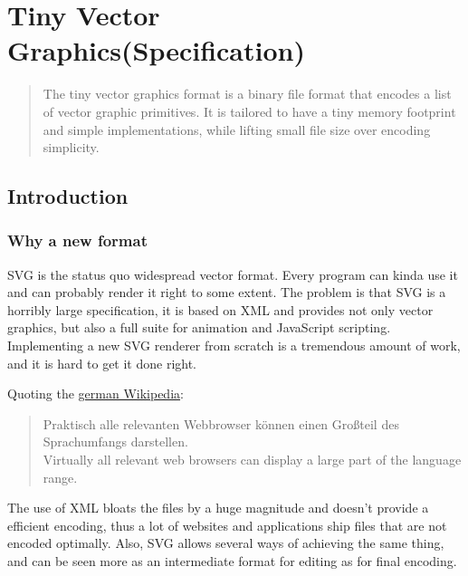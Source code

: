 \documentclass[]{article}
\begin{document}
\hypertarget{tiny-vector-graphics-specification}{%
\section{Tiny Vector Graphics(Specification)}\label{tiny-vector-graphics-specification}}

\begin{abstract}
The tiny vector graphics format is a binary file
format that encodes a list of vector graphic primitives. It is tailored
to have a tiny memory footprint and simple implementations, while
lifting small file size over encoding simplicity.
\end{abstract}


\hypertarget{introduction}{%
\subsection{Introduction}\label{introduction}}

\hypertarget{why-a-new-format}{%
\subsubsection{Why a new format}\label{why-a-new-format}}

SVG is the status quo widespread vector format. Every program can kinda
use it and can probably render it right to some extent. The problem is
that SVG is a horribly large specification, it is based on XML and
provides not only vector graphics, but also a full suite for animation
and JavaScript scripting. Implementing a new SVG renderer from scratch
is a tremendous amount of work, and it is hard to get it done right.

Quoting the \href{https://de.wikipedia.org/wiki/Scalable_Vector_Graphics}{german Wikipedia}:

\begin{quote}
Praktisch alle relevanten Webbrowser können einen Großteil des
Sprachumfangs darstellen.\\
Virtually all relevant web browsers can display a large part of the
language range.
\end{quote}

The use of XML bloats the files by a huge magnitude and doesn't provide
a efficient encoding, thus a lot of websites and applications ship files
that are not encoded optimally. Also, SVG allows several ways of
achieving the same thing, and can be seen more as an intermediate format
for editing as for final encoding.
\end{document}
